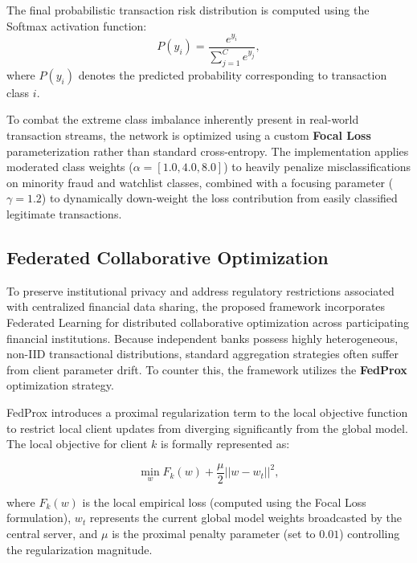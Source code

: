 \documentclass[conference]{IEEEtran}
\begin{document}
The final probabilistic transaction risk distribution is computed using the Softmax activation function:
\begin{equation}
P(y_i)=
\frac{e^{y_i}}
{\sum_{j=1}^{C} e^{y_j}},
\label{eq:softmax}
\end{equation}
where \(P(y_i)\) denotes the predicted probability corresponding to transaction class \(i\). 

To combat the extreme class imbalance inherently present in real-world transaction streams, the network is optimized using a custom \textbf{Focal Loss} parameterization rather than standard cross-entropy. The implementation applies moderated class weights ($\alpha = [1.0, 4.0, 8.0]$) to heavily penalize misclassifications on minority fraud and watchlist classes, combined with a focusing parameter ($\gamma = 1.2$) to dynamically down-weight the loss contribution from easily classified legitimate transactions.

\subsection{\textbf{Federated Collaborative Optimization}}

To preserve institutional privacy and address regulatory restrictions associated with centralized financial data sharing, the proposed framework incorporates Federated Learning for distributed collaborative optimization across participating financial institutions. Because independent banks possess highly heterogeneous, non-IID transactional distributions, standard aggregation strategies often suffer from client parameter drift. To counter this, the framework utilizes the \textbf{FedProx} optimization strategy. 

FedProx introduces a proximal regularization term to the local objective function to restrict local client updates from diverging significantly from the global model. The local objective for client $k$ is formally represented as:

\begin{equation}
\min_{w} F_k(w) + \frac{\mu}{2} ||w - w_t||^2,
\label{eq:fedprox}
\end{equation}

where $F_k(w)$ is the local empirical loss (computed using the Focal Loss formulation), $w_t$ represents the current global model weights broadcasted by the central server, and $\mu$ is the proximal penalty parameter (set to $0.01$) controlling the regularization magnitude.
\end{document}
